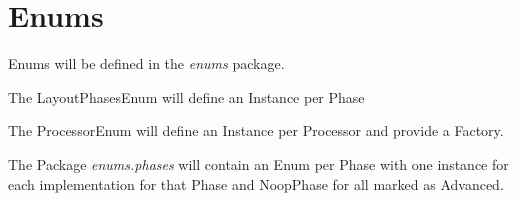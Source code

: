 \section{Enums}

Enums will be defined in the \textit{enums} package.

The LayoutPhasesEnum will define an Instance per Phase

The ProcessorEnum will define an Instance per Processor and provide a Factory.

The Package \textit{enums.phases} will contain an Enum per Phase with one
instance for each implementation for that Phase and NoopPhase for all marked as Advanced.


